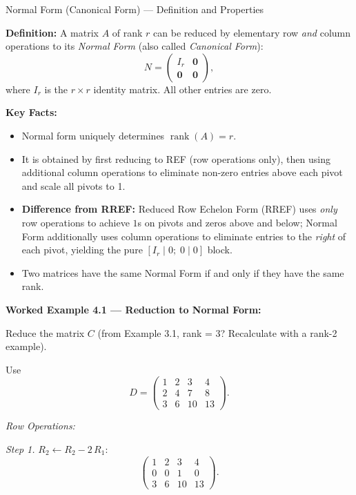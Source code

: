 \documentclass[12pt,a4paper]{article}
\begin{document}
\begin{infobox}{Normal Form (Canonical Form) --- Definition and Properties}

\textbf{Definition:} A matrix $A$ of rank $r$ can be reduced by elementary row \emph{and} column operations
to its \emph{Normal Form} (also called \emph{Canonical Form}):
\[
N = \begin{pmatrix} I_r & \mathbf{0} \\ \mathbf{0} & \mathbf{0} \end{pmatrix},
\]
where $I_r$ is the $r\times r$ identity matrix. All other entries are zero.

\textbf{Key Facts:}
\begin{itemize}
  \item Normal form uniquely determines $\operatorname{rank}(A) = r$.
  \item It is obtained by first reducing to REF (row operations only), then using additional column
        operations to eliminate non-zero entries above each pivot and scale all pivots to 1.
  \item \textbf{Difference from RREF:} Reduced Row Echelon Form (RREF) uses \emph{only} row operations
        to achieve $1$s on pivots and zeros above and below; Normal Form additionally uses column operations
        to eliminate entries to the \emph{right} of each pivot, yielding the pure $[I_r \mid 0;\; 0 \mid 0]$ block.
  \item Two matrices have the same Normal Form if and only if they have the same rank.
\end{itemize}
\end{infobox}

\textbf{Worked Example 4.1 --- Reduction to Normal Form:}

Reduce the matrix $C$ (from Example 3.1, rank = 3? Recalculate with a rank-2 example).

Use
\[
D = \begin{pmatrix} 1 & 2 & 3 & 4 \\ 2 & 4 & 7 & 8 \\ 3 & 6 & 10 & 13 \end{pmatrix}.
\]

\textit{Row Operations:}

\textit{Step 1.} $R_2 \leftarrow R_2 - 2\,R_1$:
\[
\begin{pmatrix} 1 & 2 & 3 & 4 \\ 0 & 0 & 1 & 0 \\ 3 & 6 & 10 & 13 \end{pmatrix}.
\]
\end{document}
